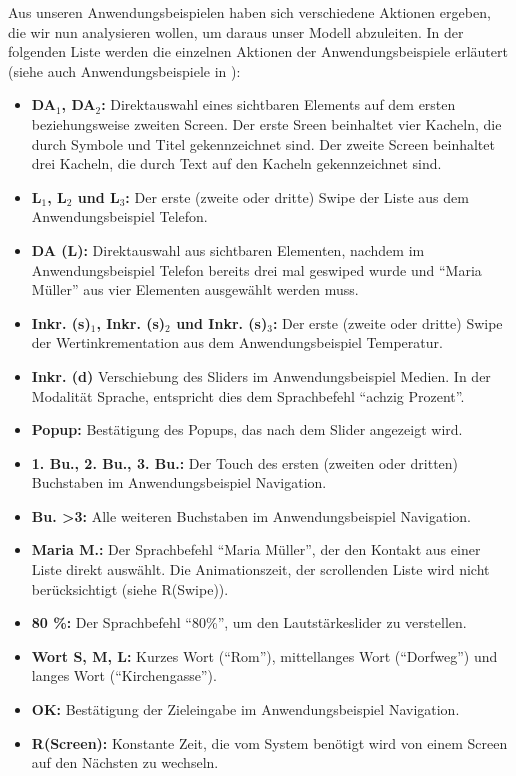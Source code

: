 Aus unseren Anwendungsbeispielen haben sich verschiedene Aktionen ergeben, die wir nun analysieren wollen, um daraus unser Modell abzuleiten.
In der folgenden Liste werden die einzelnen Aktionen der Anwendungsbeispiele erläutert (siehe auch Anwendungsbeispiele in ):
\begin{itemize}
	\item \textbf{DA$_1$, DA$_2$:} Direktauswahl eines sichtbaren Elements auf dem ersten beziehungsweise zweiten Screen.
	Der erste Sreen beinhaltet vier Kacheln, die durch Symbole und Titel gekennzeichnet sind.
	Der zweite Screen beinhaltet drei Kacheln, die durch Text auf den Kacheln gekennzeichnet sind.
	\item \textbf{L$_1$, L$_2$ und L$_3$:} Der erste (zweite oder dritte) Swipe der Liste aus dem Anwendungsbeispiel Telefon.
	\item \textbf{DA (L):} Direktauswahl aus sichtbaren Elementen, nachdem im Anwendungsbeispiel Telefon bereits drei mal geswiped wurde und "`Maria Müller"' aus vier Elementen ausgewählt werden muss.
	\item \textbf{Inkr. (s)$_1$, Inkr. (s)$_2$ und Inkr. (s)$_3$:} Der erste (zweite oder dritte) Swipe der Wertinkrementation aus dem Anwendungsbeispiel Temperatur.
	\item \textbf{Inkr. (d)} Verschiebung des Sliders im Anwendungsbeispiel Medien.
	In der Modalität Sprache, entspricht dies dem Sprachbefehl "`achzig Prozent"'.
	\item \textbf{Popup:} Bestätigung des Popups, das nach dem Slider angezeigt wird.
	\item \textbf{1. Bu., 2. Bu., 3. Bu.:} Der Touch des ersten (zweiten oder dritten) Buchstaben im Anwendungsbeispiel Navigation.
	\item \textbf{Bu. >3:} Alle weiteren Buchstaben im Anwendungsbeispiel Navigation.
  \item \textbf{Maria M.:} Der Sprachbefehl "`Maria Müller"', der den Kontakt aus einer Liste direkt auswählt.
  Die Animationszeit, der scrollenden Liste wird nicht berücksichtigt (siehe R(Swipe)).
	\item \textbf{80 \%:} Der Sprachbefehl "`80\%"', um den Lautstärkeslider zu verstellen.
	\item \textbf{Wort S, M, L:} Kurzes Wort ("`Rom"'), mittellanges Wort ("`Dorfweg"') und langes Wort ("`Kirchengasse"').
	\item \textbf{OK:} Bestätigung der Zieleingabe im Anwendungsbeispiel Navigation.
	\item \textbf{R(Screen):} Konstante Zeit, die vom System benötigt wird von einem Screen auf den Nächsten zu wechseln.

\end{itemize}
